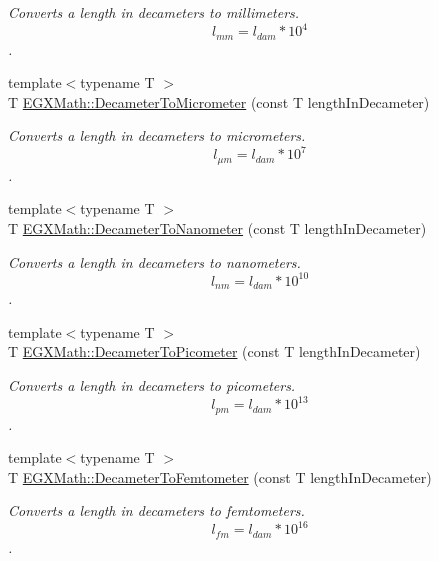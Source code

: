 \begin{DoxyCompactItemize}
\begin{DoxyCompactList}\small\item\em Converts a length in decameters to millimeters. \[ l_{mm}=l_{dam} * 10^{4} \]. \end{DoxyCompactList}\item 
{\footnotesize template$<$typename T $>$ }\\T \mbox{\hyperlink{group___e_g_x_math-_conversions-_length_conversions-_s_i-_decameter-_s_i_gaa5b6d3a32a921345aa1ccb66a8df07c1}{E\+G\+X\+Math\+::\+Decameter\+To\+Micrometer}} (const T length\+In\+Decameter)
\begin{DoxyCompactList}\small\item\em Converts a length in decameters to micrometers. \[ l_{\mu m}=l_{dam} * 10^{7} \]. \end{DoxyCompactList}\item 
{\footnotesize template$<$typename T $>$ }\\T \mbox{\hyperlink{group___e_g_x_math-_conversions-_length_conversions-_s_i-_decameter-_s_i_gad2173f361037d8cfbdcc6b99c79a9105}{E\+G\+X\+Math\+::\+Decameter\+To\+Nanometer}} (const T length\+In\+Decameter)
\begin{DoxyCompactList}\small\item\em Converts a length in decameters to nanometers. \[ l_{nm}=l_{dam} * 10^{10} \]. \end{DoxyCompactList}\item 
{\footnotesize template$<$typename T $>$ }\\T \mbox{\hyperlink{group___e_g_x_math-_conversions-_length_conversions-_s_i-_decameter-_s_i_gab265bbced03f7b08cf4ad0db29da6dfd}{E\+G\+X\+Math\+::\+Decameter\+To\+Picometer}} (const T length\+In\+Decameter)
\begin{DoxyCompactList}\small\item\em Converts a length in decameters to picometers. \[ l_{pm}=l_{dam} * 10^{13} \]. \end{DoxyCompactList}\item 
{\footnotesize template$<$typename T $>$ }\\T \mbox{\hyperlink{group___e_g_x_math-_conversions-_length_conversions-_s_i-_decameter-_s_i_gae42b64853340c10623d206afbc6a9ff4}{E\+G\+X\+Math\+::\+Decameter\+To\+Femtometer}} (const T length\+In\+Decameter)
\begin{DoxyCompactList}\small\item\em Converts a length in decameters to femtometers. \[ l_{fm}=l_{dam} * 10^{16} \]. \end{DoxyCompactList}\item 

\end{DoxyCompactItemize}
